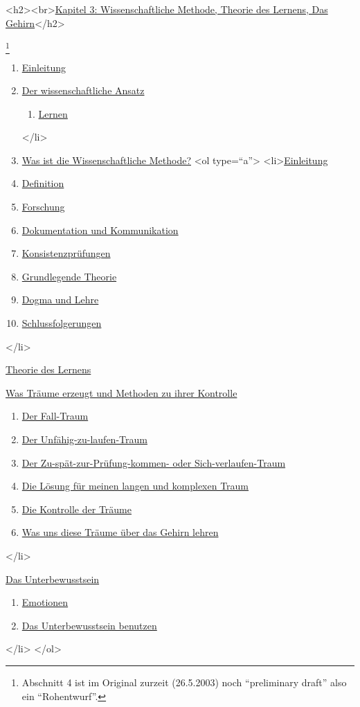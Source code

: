 <h2><br>\hyperlink{c3_1}{Kapitel 3: Wissenschaftliche Methode, Theorie des Lernens, Das Gehirn}</h2>

\footnote{Abschnitt 4 ist im Original zurzeit (26.5.2003) noch \enquote{preliminary draft} also ein \enquote{Rohentwurf}.}


\begin{enumerate} 
 \item \hyperlink{c3_1}{Einleitung}
 \item \hyperlink{c3_2}{Der wissenschaftliche Ansatz}
  \begin{enumerate}[label={\alph*.}] 
   <li>\hyperlink{c3_2a}{Einleitung}
   \item \hyperlink{c3_2b}{Lernen}
   \end{enumerate}
 </li>
 \item \hyperlink{c3_3}{Was ist die Wissenschaftliche Methode?}
  <ol type=\enquote{a}>
   <li>\hyperlink{c3_3a}{Einleitung}
   \item \hyperlink{c3_3b}{Definition}
   \item \hyperlink{c3_3c}{Forschung}
   \item \hyperlink{c3_3d}{Dokumentation und Kommunikation}
   \item \hyperlink{c3_3e}{Konsistenzprüfungen}
   \item \hyperlink{c3_3f}{Grundlegende Theorie}
   \item \hyperlink{c3_3g}{Dogma und Lehre}
   \item \hyperlink{c3_3h}{Schlussfolgerungen}
   \end{enumerate}
 </li>
 \item \hyperlink{c3_4}{Theorie des Lernens}
 \item \hyperlink{c3_5}{Was Träume erzeugt und Methoden zu ihrer Kontrolle}
  \begin{enumerate}[label={\alph*.}] 
   <li>\hyperlink{c3_5a}{Einleitung}
   \item \hyperlink{c3_5b}{Der Fall-Traum}
   \item \hyperlink{c3_5c}{Der Unfähig-zu-laufen-Traum}
   \item \hyperlink{c3_5d}{Der Zu-spät-zur-Prüfung-kommen- oder Sich-verlaufen-Traum}
   \item \hyperlink{c3_5e}{Die Lösung für meinen langen und komplexen Traum}
   \item \hyperlink{c3_5f}{Die Kontrolle der Träume}
   \item \hyperlink{c3_5g}{Was uns diese Träume über das Gehirn lehren}
   \end{enumerate}
</li>
 \item \hyperlink{c3_6}{Das Unterbewusstsein}
  \begin{enumerate}[label={\alph*.}] 
   <li>\hyperlink{c3_6a}{Einleitung}
   \item \hyperlink{c3_6b}{Emotionen}
   \item \hyperlink{c3_6c}{Das Unterbewusstsein benutzen}
   \end{enumerate}
</li>
</ol>

